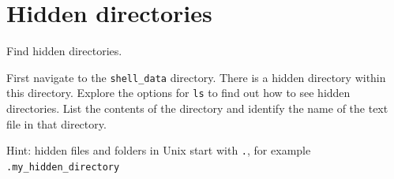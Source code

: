 \documentclass[
  letterpaper,
  DIV=11,
  numbers=noendperiod]{scrreprt}
\begin{document}
\section{Hidden directories}\label{hidden-directories}

\begin{tcolorbox}[enhanced jigsaw, opacitybacktitle=0.6, colback=white, coltitle=black, opacityback=0, rightrule=.15mm, toptitle=1mm, toprule=.15mm, bottomtitle=1mm, colframe=quarto-callout-caution-color-frame, arc=.35mm, titlerule=0mm, colbacktitle=quarto-callout-caution-color!10!white, leftrule=.75mm, title={Exercise}, breakable, bottomrule=.15mm, left=2mm]

Find hidden directories.

First navigate to the \texttt{shell\_data} directory. There is a hidden
directory within this directory. Explore the options for \texttt{ls} to
find out how to see hidden directories. List the contents of the
directory and identify the name of the text file in that directory.

Hint: hidden files and folders in Unix start with \texttt{.}, for
example \texttt{.my\_hidden\_directory}

\end{tcolorbox}
\end{document}
